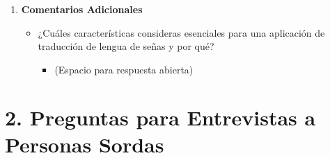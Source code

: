 \begin{enumerate}
    \item \textbf{Comentarios Adicionales}
    \begin{itemize}
        \item ¿Cuáles características consideras esenciales para una aplicación de traducción de lengua de señas y por qué?
        \begin{itemize}
            \item (Espacio para respuesta abierta)
        \end{itemize}
    \end{itemize}
\end{enumerate}

\section*{2. Preguntas para Entrevistas a Personas Sordas}

